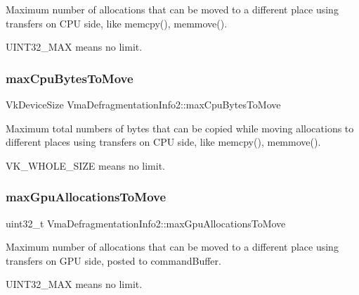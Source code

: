 Maximum number of allocations that can be moved to a different place using transfers on C\+PU side, like {\ttfamily memcpy()}, {\ttfamily memmove()}. 

{\ttfamily U\+I\+N\+T32\+\_\+\+M\+AX} means no limit. \mbox{\label{structVmaDefragmentationInfo2_af78e1ea40c22d85137b65f6b384a4d0a}} 
\subsubsection{\texorpdfstring{max\+Cpu\+Bytes\+To\+Move}{maxCpuBytesToMove}}
{\footnotesize\ttfamily Vk\+Device\+Size Vma\+Defragmentation\+Info2\+::max\+Cpu\+Bytes\+To\+Move}



Maximum total numbers of bytes that can be copied while moving allocations to different places using transfers on C\+PU side, like {\ttfamily memcpy()}, {\ttfamily memmove()}. 

{\ttfamily V\+K\+\_\+\+W\+H\+O\+L\+E\+\_\+\+S\+I\+ZE} means no limit. \mbox{\label{structVmaDefragmentationInfo2_a40d53d33e71ba0b66f844ed63c05a3f6}} 
\subsubsection{\texorpdfstring{max\+Gpu\+Allocations\+To\+Move}{maxGpuAllocationsToMove}}
{\footnotesize\ttfamily uint32\+\_\+t Vma\+Defragmentation\+Info2\+::max\+Gpu\+Allocations\+To\+Move}



Maximum number of allocations that can be moved to a different place using transfers on G\+PU side, posted to {\ttfamily command\+Buffer}. 

{\ttfamily U\+I\+N\+T32\+\_\+\+M\+AX} means no limit. \mbox{\label{structVmaDefragmentationInfo2_a4ddbc898d0afe1518f863a3763628f08}} 
